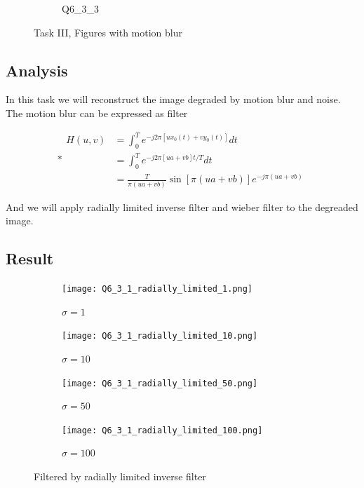\documentclass[
	12pt, %
]{style/fphw}
\begin{document}
\begin{problem}
\begin{figure}[H]
\begin{subfigure}[b]{.3\textwidth}
			\caption{Q6\_3\_3}
			\label{Q6_3_3}
		\end{subfigure}
		\caption{Task III, Figures with motion blur}
    	\label{Task III, Figures with motion blur}	
	\end{figure}

\end{problem}

\subsection*{Analysis}

In this task we will reconstruct the image degraded by motion blur and noise. The motion blur can be expressed as filter 

\begin{equation}*
	\begin{aligned}
	H(u, v) &=\int_{0}^{T} e^{-j 2 \pi\left[u x_{0}(t)+v y_{0}(t)\right]} d t \\
	&=\int_{0}^{T} e^{-j 2 \pi[u a+v b] t / T} d t \\
	&=\frac{T}{\pi(u a+v b)} \sin [\pi(u a+v b)] e^{-j \pi(u a+v b)}
	\end{aligned}
\end{equation}

And we will apply radially limited inverse filter and wieber filter to the degreaded image.

\subsection*{Result}

	\begin{figure}[H]
		\centering
		\begin{subfigure}[b]{.24\textwidth}
			\centering
			\texttt{[image: Q6\_3\_1\_radially\_limited\_1.png]}
			\caption{$\sigma=1$}
			\label{Q6_3_1_radially_limited_1}
		\end{subfigure}
		\hfill
		\begin{subfigure}[b]{.24\textwidth}
			\centering
			\texttt{[image: Q6\_3\_1\_radially\_limited\_10.png]}
			\caption{$\sigma=10$}
			\label{Q6_3_1_radially_limited_10}
		\end{subfigure}
		\hfill
		\begin{subfigure}[b]{.24\textwidth}
			\centering
			\texttt{[image: Q6\_3\_1\_radially\_limited\_50.png]}
			\caption{$\sigma=50$}
			\label{Q6_3_1_radially_limited_50}
		\end{subfigure}
		\hfill
		\begin{subfigure}[b]{.24\textwidth}
			\centering
			\texttt{[image: Q6\_3\_1\_radially\_limited\_100.png]}
			\caption{$\sigma=100$}
			\label{Q6_3_1_radially_limited_100}
		\end{subfigure}
		\caption{Filtered by radially limited inverse filter}
		\label{Motion, radially limited inverse filter}	
	\end{figure}
\end{document}
